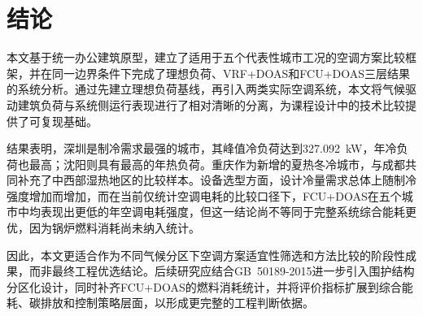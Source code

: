 \section{结论}

本文基于统一办公建筑原型，建立了适用于五个代表性城市工况的空调方案比较框架，并在同一边界条件下完成了理想负荷、VRF+DOAS和FCU+DOAS三层结果的系统分析。通过先建立理想负荷基线，再引入两类实际空调系统，本文将气候驱动建筑负荷与系统侧运行表现进行了相对清晰的分离，为课程设计中的技术比较提供了可复现基础。

结果表明，深圳是制冷需求最强的城市，其峰值冷负荷达到\SI{327.092}{\kilo\watt}，年冷负荷也最高；沈阳则具有最高的年热负荷。重庆作为新增的夏热冬冷城市，与成都共同补充了中西部湿热地区的比较样本。设备选型方面，设计冷量需求总体上随制冷强度增加而增加，而在当前仅统计空调电耗的比较口径下，FCU+DOAS在五个城市中均表现出更低的年空调电耗强度，但这一结论尚不等同于完整系统综合能耗更优，因为锅炉燃料消耗尚未纳入统计。

因此，本文更适合作为不同气候分区下空调方案适宜性筛选和方法比较的阶段性成果，而非最终工程优选结论。后续研究应结合GB~50189-2015进一步引入围护结构分区化设计，同时补齐FCU+DOAS的燃料消耗统计，并将评价指标扩展到综合能耗、碳排放和控制策略层面，以形成更完整的工程判断依据。
